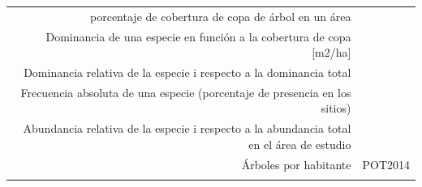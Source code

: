 \documentclass[12pt,]{book}
\begin{document}
\begin{longtable}[]{@{}rr@{}}
\begin{minipage}[t]{0.57\columnwidth}\raggedleft\strut
porcentaje de cobertura de copa de árbol en un área\strut
\end{minipage} & \begin{minipage}[t]{0.31\columnwidth}\raggedleft\strut
\citep{nowak_sustaining_2010}\strut
\end{minipage}\tabularnewline
\begin{minipage}[t]{0.57\columnwidth}\raggedleft\strut
Dominancia de una especie en función a la cobertura de copa
{[}m2/ha{]}\strut
\end{minipage} & \begin{minipage}[t]{0.31\columnwidth}\raggedleft\strut
\citep{alanis_estructura_2014}\strut
\end{minipage}\tabularnewline
\begin{minipage}[t]{0.57\columnwidth}\raggedleft\strut
Dominancia relativa de la especie i respecto a la dominancia total\strut
\end{minipage} & \begin{minipage}[t]{0.31\columnwidth}\raggedleft\strut
\citep{alanis_estructura_2014}\strut
\end{minipage}\tabularnewline
\begin{minipage}[t]{0.57\columnwidth}\raggedleft\strut
Frecuencia absoluta de una especie (porcentaje de presencia en los
sitios)\strut
\end{minipage} & \begin{minipage}[t]{0.31\columnwidth}\raggedleft\strut
\citep{alanis_estructura_2014}\strut
\end{minipage}\tabularnewline
\begin{minipage}[t]{0.57\columnwidth}\raggedleft\strut
Abundancia relativa de la especie i respecto a la abundancia total en el
área de estudio\strut
\end{minipage} & \begin{minipage}[t]{0.31\columnwidth}\raggedleft\strut
\citep{alanis_estructura_2014}\strut
\end{minipage}\tabularnewline
\begin{minipage}[t]{0.57\columnwidth}\raggedleft\strut
Árboles por habitante\strut
\end{minipage} & \begin{minipage}[t]{0.31\columnwidth}\raggedleft\strut
POT2014\strut
\end{minipage}\tabularnewline
\begin{minipage}[t]{0.57\columnwidth}\raggedleft\strut

\end{minipage}
\end{longtable}
\end{document}
